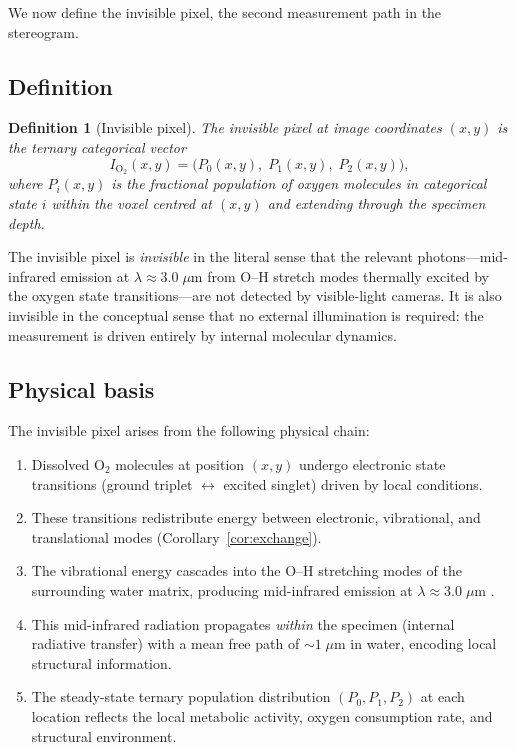 \documentclass[11pt,twocolumn,a4paper]{article}
\newtheorem{definition}{Definition}
\begin{document}
We now define the invisible pixel, the second measurement path in the stereogram.

\subsection{Definition}

\begin{definition}[Invisible pixel]\label{def:invpixel}
The invisible pixel at image coordinates $(x,y)$ is the ternary categorical vector
\begin{equation}\label{eq:invpixel}
I_{\mathrm{O}_2}(x,y) = \bigl(P_0(x,y),\; P_1(x,y),\; P_2(x,y)\bigr),
\end{equation}
where $P_i(x,y)$ is the fractional population of oxygen molecules in categorical state $i$ within the voxel centred at $(x,y)$ and extending through the specimen depth.
\end{definition}

The invisible pixel is \emph{invisible} in the literal sense that the relevant photons---mid-infrared emission at $\lambda \approx 3.0\;\mu$m from O--H stretch modes thermally excited by the oxygen state transitions---are not detected by visible-light cameras.
It is also invisible in the conceptual sense that no external illumination is required: the measurement is driven entirely by internal molecular dynamics.

\subsection{Physical basis}

The invisible pixel arises from the following physical chain:
\begin{enumerate}
\item Dissolved O$_2$ molecules at position $(x,y)$ undergo electronic state transitions (ground triplet $\leftrightarrow$ excited singlet) driven by local conditions.
\item These transitions redistribute energy between electronic, vibrational, and translational modes (Corollary~\ref{cor:exchange}).
\item The vibrational energy cascades into the O--H stretching modes of the surrounding water matrix, producing mid-infrared emission at $\lambda \approx 3.0\;\mu$m \citep{Falk1984,Bertie1996}.
\item This mid-infrared radiation propagates \emph{within} the specimen (internal radiative transfer) with a mean free path of ${\sim}1\;\mu$m in water, encoding local structural information.
\item The steady-state ternary population distribution $(P_0, P_1, P_2)$ at each location reflects the local metabolic activity, oxygen consumption rate, and structural environment.
\end{enumerate}
\end{document}
